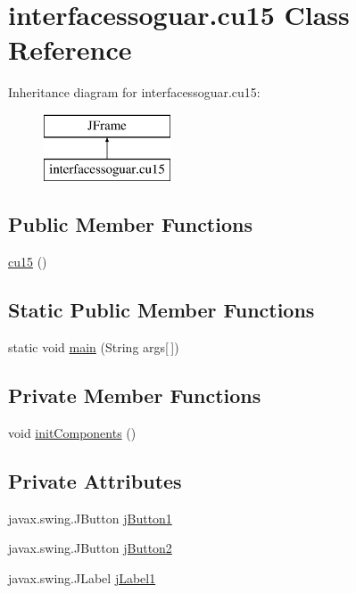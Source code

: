 \hypertarget{classinterfacessoguar_1_1cu15}{}\section{interfacessoguar.\+cu15 Class Reference}
\label{classinterfacessoguar_1_1cu15}
Inheritance diagram for interfacessoguar.\+cu15\+:\begin{figure}[H]
\begin{center}
\leavevmode
\includegraphics[height=2.000000cm]{classinterfacessoguar_1_1cu15}
\end{center}
\end{figure}
\subsection*{Public Member Functions}
\begin{DoxyCompactItemize}
\item 
\mbox{\hyperlink{classinterfacessoguar_1_1cu15_ad7d9907f41ebfa566258331685fb979d}{cu15}} ()
\end{DoxyCompactItemize}
\subsection*{Static Public Member Functions}
\begin{DoxyCompactItemize}
\item 
static void \mbox{\hyperlink{classinterfacessoguar_1_1cu15_a4769f17934ff53e5be14af89b2502753}{main}} (String args\mbox{[}$\,$\mbox{]})
\end{DoxyCompactItemize}
\subsection*{Private Member Functions}
\begin{DoxyCompactItemize}
\item 
void \mbox{\hyperlink{classinterfacessoguar_1_1cu15_a56f82e93f1ba9008728e1abb9f08b8cf}{init\+Components}} ()
\end{DoxyCompactItemize}
\subsection*{Private Attributes}
\begin{DoxyCompactItemize}
\item 
javax.\+swing.\+J\+Button \mbox{\hyperlink{classinterfacessoguar_1_1cu15_ae1acd607eefe095a62fbcf493003df08}{j\+Button1}}
\item 
javax.\+swing.\+J\+Button \mbox{\hyperlink{classinterfacessoguar_1_1cu15_a085521a7cfa254458af69b9b16239bc7}{j\+Button2}}
\item 
javax.\+swing.\+J\+Label \mbox{\hyperlink{classinterfacessoguar_1_1cu15_a783e8806159d278353a089058f4bbcc4}{j\+Label1}}
\end{DoxyCompactItemize}


